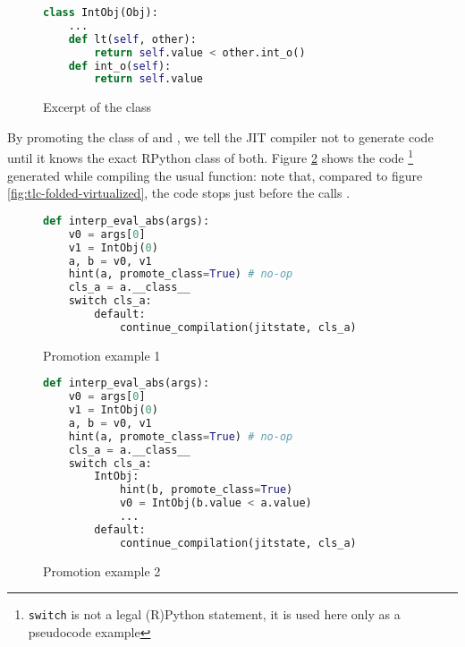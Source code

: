 \begin{figure}[h]
\begin{center}
\begin{lstlisting}[language=Python]
class IntObj(Obj):
    ...
    def lt(self, other): 
        return self.value < other.int_o()
    def int_o(self):
        return self.value
\end{lstlisting}
\caption{Excerpt of the  class}
\label{fig:tlc-intobj}
\end{center}
\end{figure}

By promoting the class of  and , we tell the JIT
compiler not to generate code until it knows the exact RPython class of both.
Figure \ref{fig:tlc-abs-promotion-1} shows the
code \footnote{\lstinline{switch} is not a legal (R)Python statement, it is
  used here only as a pseudocode example} generated while compiling the usual
 function: note that, compared to figure
\ref{fig:tlc-folded-virtualized}, the code stops just before the calls
.

\begin{figure}[h]
\begin{center}
\begin{lstlisting}[language=Python]
def interp_eval_abs(args):
    v0 = args[0]
    v1 = IntObj(0)
    a, b = v0, v1
    hint(a, promote_class=True) # no-op
    cls_a = a.__class__
    switch cls_a:
        default: 
            continue_compilation(jitstate, cls_a)
\end{lstlisting}
\caption{Promotion example 1}
\label{fig:tlc-abs-promotion-1}
\end{center}
\end{figure}

\begin{figure}[h]
\begin{center}
\begin{lstlisting}[language=Python]
def interp_eval_abs(args):
    v0 = args[0]
    v1 = IntObj(0)
    a, b = v0, v1
    hint(a, promote_class=True) # no-op
    cls_a = a.__class__
    switch cls_a:
        IntObj:
            hint(b, promote_class=True)
            v0 = IntObj(b.value < a.value)
            ...
        default: 
            continue_compilation(jitstate, cls_a)
\end{lstlisting}
\caption{Promotion example 2}
\label{fig:tlc-abs-promotion-2}
\end{center}
\end{figure}

